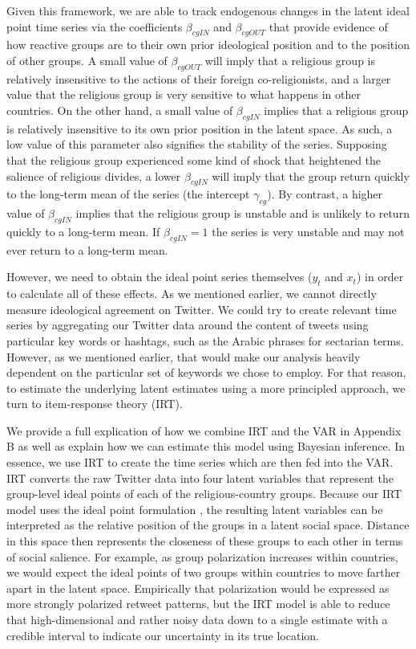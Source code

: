 \documentclass[12pt]{article}
\begin{document}
Given this framework, we are able to track endogenous changes in the latent ideal point time series via the coefficients $\beta_{cgIN}$ and $\beta_{cgOUT}$ that provide evidence of how reactive groups are to their own prior ideological position and to the position of other groups. A small value of $\beta_{cgOUT}$ will imply that a religious group is relatively insensitive to the actions of their foreign co-religionists, and a larger value that the religious group is very sensitive to what happens in other countries. On the other hand, a small value of $\beta_{cgIN}$ implies that a religious group is relatively insensitive to its own prior position in the latent space. As such, a low value of this parameter also signifies the stability of the series. Supposing that the religious group experienced some kind of shock that heightened the salience of religious divides, a lower $\beta_{cgIN}$ will imply that the group return quickly to the long-term mean of the series (the intercept $\gamma_{cg}$). By contrast, a higher value of $\beta_{cgIN}$ implies that the religious group is unstable and is unlikely to return quickly to a long-term mean. If $\beta_{cgIN} = 1$ the series is very unstable and may not ever return to a long-term mean.

However, we need to obtain the ideal point series themselves ($y_t$ and $x_t$) in order to calculate all of these effects. As we mentioned earlier, we cannot directly measure ideological agreement on Twitter. We could try to create relevant time series by aggregating our Twitter data around the content of tweets using particular key words or hashtags, such as the Arabic phrases for sectarian terms. However, as we mentioned earlier, that would make our analysis heavily dependent on the particular set of keywords we chose to employ. For that reason, to estimate the underlying latent estimates using a more principled approach, we turn to item-response theory (IRT).

We provide a full explication of how we combine IRT and the VAR in Appendix B as well as explain how we can estimate this model using Bayesian inference. In essence, we use IRT to create the time series which are then fed into the VAR. IRT converts the raw Twitter data into four latent variables that represent the group-level ideal points of each of the religious-country groups. Because our IRT model uses the ideal point formulation \parencite{jackman2004}, the resulting latent variables can be interpreted as the relative position of the groups in a latent social space. Distance in this space then represents the closeness of these groups to each other in terms of social salience. For example, as group polarization increases within countries, we would expect the ideal points of two groups within countries to move farther apart in the latent space. Empirically that polarization would be expressed as more strongly polarized retweet patterns, but the IRT model is able to reduce that high-dimensional and rather noisy data down to a single estimate with a credible interval to indicate our uncertainty in its true location.
\end{document}
